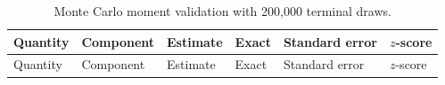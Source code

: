 \documentclass[
  english,
  10pt,
  letterpaper,
  DIV=11,
  numbers=noendperiod]{scrartcl}
\theoremstyle{plain}
\theoremstyle{remark}
\begin{document}
\begin{longtable}[]{@{}
  >{\raggedright\arraybackslash}p{}
  >{\raggedright\arraybackslash}p{}
  >{\raggedleft\arraybackslash}p{}
  >{\raggedleft\arraybackslash}p{}
  >{\raggedleft\arraybackslash}p{}
  >{\raggedleft\arraybackslash}p{}@{}}
\caption{Monte Carlo moment validation with 200,000 terminal
draws.}\label{tbl-moments}\tabularnewline
\toprule\noalign{}
\begin{minipage}[b]{\linewidth}\raggedright
Quantity
\end{minipage} & \begin{minipage}[b]{\linewidth}\raggedright
Component
\end{minipage} & \begin{minipage}[b]{\linewidth}\raggedleft
Estimate
\end{minipage} & \begin{minipage}[b]{\linewidth}\raggedleft
Exact
\end{minipage} & \begin{minipage}[b]{\linewidth}\raggedleft
Standard error
\end{minipage} & \begin{minipage}[b]{\linewidth}\raggedleft
\(z\)-score
\end{minipage} \\
\midrule\noalign{}
\endfirsthead
\toprule\noalign{}
\begin{minipage}[b]{\linewidth}\raggedright
Quantity
\end{minipage} & \begin{minipage}[b]{\linewidth}\raggedright
Component
\end{minipage} & \begin{minipage}[b]{\linewidth}\raggedleft
Estimate
\end{minipage} & \begin{minipage}[b]{\linewidth}\raggedleft
Exact
\end{minipage} & \begin{minipage}[b]{\linewidth}\raggedleft
Standard error
\end{minipage} & \begin{minipage}[b]{\linewidth}\raggedleft
\(z\)-score
\end{minipage} \\

\end{longtable}
\end{document}
